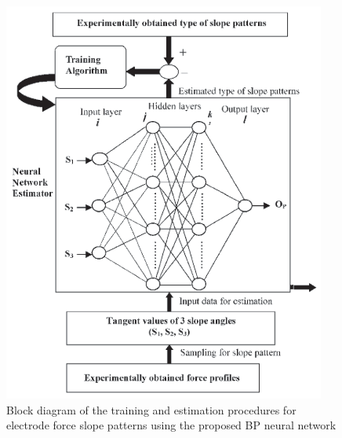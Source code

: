 \documentclass[english,ngerman]{tudscrreprt}
\begin{document}
\begin{figure}[H]
\centering
\includegraphics[scale = 0.8]{./Bilder/Block diagram of the training and estimation procedures for electrode force slope patterns using the proposed BP neural network.png}
\caption{Block diagram of the training and estimation procedures for electrode force slope patterns using the proposed BP neural network}\label{fgg:T}
\end{figure}


\newpage
\printbibliography[heading=bibintoc]\label{sec:bibliography}%
\end{document}
